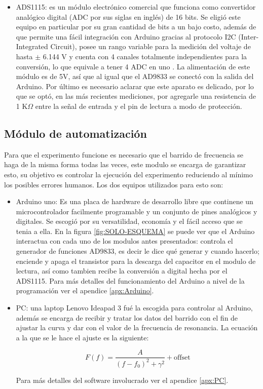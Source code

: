 \begin{itemize}
  \item ADS1115: es un módulo electrónico comercial que funciona como convertidor analógico digital (ADC por sus siglas en inglés) de 16 bits. Se eligió este equipo en particular por su gran cantidad de bits a un bajo costo, además de que permite una fácil integración con Arduino gracias al protocolo I2C (Inter-Integrated Circuit), posee un rango variable para la medición del voltaje de hasta $\pm$ 6.144 V y cuenta con 4 canales totalmente independientes para la conversión, lo que equivale a tener 4 ADC en uno \cite{ad9833_datasheet}. La alimentación de este módulo es de 5V, así que al igual que el AD9833 se conectó con la salida del Arduino. Por último es necesario aclarar que este aparato es delicado, por lo que se optó, en las más recientes mediciones, por agregarle una resistencia de 1 K$\Omega$  entre la señal de entrada y el pin de lectura a modo de protección.
\end{itemize}

\subsection{Módulo de automatización}

Para que el experimento funcione es necesario que el barrido de frecuencia se haga de la misma forma todas las veces, este modulo se encarga de garantizar esto, su objetivo es controlar la ejecución del experimento reduciendo al mínimo los posibles errores humanos. Los dos equipos utilizados para esto son:

\begin{itemize}
  \item Arduino uno: Es una placa de hardware de desarrollo libre que continene un microcontrolador facilmente programable y un conjunto de pines analógicos y digitales. Se escogió por su versatilidad, economía y el fácil acceso que se tenia a ella. En la figura \ref{fig:SOLO-ESQUEMA} se puede ver que el Arduino interactua con cada uno de los modulos antes presentados: controla el generador de funciones AD9833, es decir le dice qué generar y cuando hacerlo; enciende y apaga el transistor para la descarga del capacitor en el modulo de lectura, así como tambien recibe la conversión a digital hecha por el ADS1115. Para más detalles del funcionamiento del Arduino a nivel de la programación ver el apendice \ref{apx:Arduino}.
  
  \item PC: una laptop Lenovo Ideapad 3 fué la escogida para controlar al Arduino, además se encarga de recibir y tratar los datos del barrido con el fin de ajustar la curva y dar con el valor de la frecuencia de resonancia. La ecuación a la que se le hace el ajuste es la siguiente:
  
  \begin{equation}\label{ecu:lorentz}
    F(f) = \frac{A}{(f - f_0)^2 + \gamma^2} + \text{offset}
\end{equation}

  Para más detalles del software involucrado ver el apendice \ref{apx:PC}.
    
\end{itemize}
